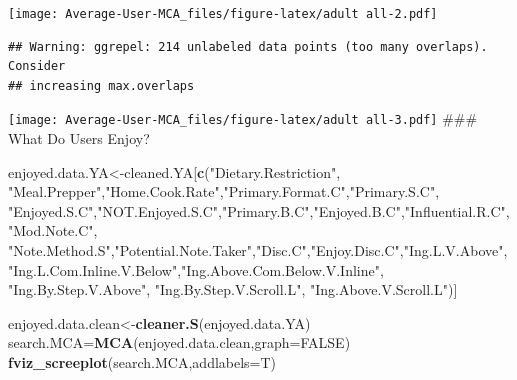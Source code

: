 \documentclass[
]{article}
\newenvironment{Shaded}{\begin{snugshade}}{\end{snugshade}}
\newcommand{\DataTypeTok}[1]{\textcolor[rgb]{0.13,0.29,0.53}{#1}}
\newcommand{\KeywordTok}[1]{\textcolor[rgb]{0.13,0.29,0.53}{\textbf{#1}}}
\newcommand{\NormalTok}[1]{#1}
\newcommand{\OtherTok}[1]{\textcolor[rgb]{0.56,0.35,0.01}{#1}}
\newcommand{\StringTok}[1]{\textcolor[rgb]{0.31,0.60,0.02}{#1}}
\begin{document}
\texttt{[image: Average-User-MCA\_files/figure-latex/adult all-2.pdf]}

\begin{Shaded}
\end{Shaded}

\begin{verbatim}
## Warning: ggrepel: 214 unlabeled data points (too many overlaps). Consider
## increasing max.overlaps
\end{verbatim}

\texttt{[image: Average-User-MCA\_files/figure-latex/adult all-3.pdf]}
\#\#\# What Do Users Enjoy?

\begin{Shaded}
\begin{Highlighting}[]
\NormalTok{enjoyed.data.YA<-cleaned.YA[}\KeywordTok{c}\NormalTok{(}\StringTok{"Dietary.Restriction"}\NormalTok{, }\StringTok{"Meal.Prepper"}\NormalTok{,}\StringTok{"Home.Cook.Rate"}\NormalTok{,}\StringTok{"Primary.Format.C"}\NormalTok{,}\StringTok{"Primary.S.C"}\NormalTok{,}
            \StringTok{"Enjoyed.S.C"}\NormalTok{,}\StringTok{"NOT.Enjoyed.S.C"}\NormalTok{,}\StringTok{"Primary.B.C"}\NormalTok{,}\StringTok{"Enjoyed.B.C"}\NormalTok{,}\StringTok{"Influential.R.C"}\NormalTok{, }
            \StringTok{"Mod.Note.C"}\NormalTok{, }
            \StringTok{"Note.Method.S"}\NormalTok{,}\StringTok{"Potential.Note.Taker"}\NormalTok{,}\StringTok{"Disc.C"}\NormalTok{,}\StringTok{"Enjoy.Disc.C"}\NormalTok{,}\StringTok{"Ing.L.V.Above"}\NormalTok{,}
            \StringTok{"Ing.L.Com.Inline.V.Below"}\NormalTok{,}\StringTok{"Ing.Above.Com.Below.V.Inline"}\NormalTok{,  }\StringTok{"Ing.By.Step.V.Above"}\NormalTok{,  }\StringTok{"Ing.By.Step.V.Scroll.L"}\NormalTok{,}
            \StringTok{"Ing.Above.V.Scroll.L"}\NormalTok{)]}

\NormalTok{enjoyed.data.clean<-}\KeywordTok{cleaner.S}\NormalTok{(enjoyed.data.YA)}
\NormalTok{search.MCA=}\KeywordTok{MCA}\NormalTok{(enjoyed.data.clean,}\DataTypeTok{graph=}\OtherTok{FALSE}\NormalTok{)}
\KeywordTok{fviz_screeplot}\NormalTok{(search.MCA,}\DataTypeTok{addlabels=}\NormalTok{T)}
\end{Highlighting}
\end{Shaded}
\end{document}
